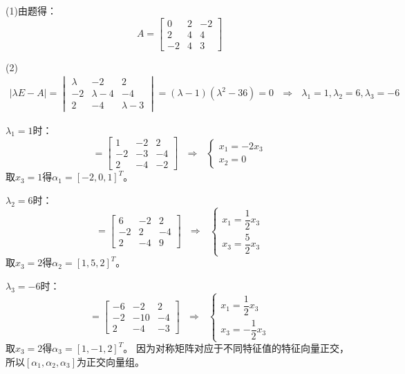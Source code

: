 \documentclass{article}
\begin{document}
\begin{jie}
(1)由题得：
\begin{equation*}
  A=\begin{bmatrix}
      0 & 2 & -2 \\
      2& 4 & 4\\
      -2 & 4 & 3
    \end{bmatrix}
\end{equation*}

(2)
\begin{align*}
|\lambda E-A|=
\begin{vmatrix}
  \lambda & -2 & 2 \\
      -2& \lambda-4 & -4\\
      2 & -4 & \lambda-3
\end{vmatrix}=(\lambda-1)(\lambda^2-36)=0~~~\Rightarrow~~~\lambda_1=1,\lambda_2=6,\lambda_3=-6
\end{align*}

$\lambda_1=1$时：
\begin{equation*}
[\lambda E-A]=
\begin{bmatrix}
 1 & -2 & 2 \\
      -2& -3 & -4\\
      2 & -4 & -2
\end{bmatrix}~~~\Rightarrow~~~
\begin{cases}
 x_1=-2x_3\\
 x_2=0
\end{cases}
\end{equation*}
取$x_3=1$得$\alpha_1=[-2,0,1]^T$。

$\lambda_2=6$时：
\begin{equation*}
[\lambda E-A]=
\begin{bmatrix}
 6 & -2 & 2 \\
      -2& 2 & -4\\
      2 & -4 & 9
\end{bmatrix}~~~\Rightarrow~~~
\begin{cases}
 x_1=\dfrac{1}{2}x_3\\[2mm]
 x_3=\dfrac{5}{2}x_3
\end{cases}
\end{equation*}
取$x_3=2$得$\alpha_2=[1,5,2]^T$。

$\lambda_3=-6$时：
\begin{equation*}
[\lambda E-A]=
\begin{bmatrix}
 -6 & -2 & 2 \\
      -2&-10 & -4\\
      2 & -4 &-3
\end{bmatrix}~~~\Rightarrow~~~
\begin{cases}
 x_1=\dfrac{1}{2}x_3\\[2mm]
 x_3=-\dfrac{1}{2}x_3
\end{cases}
\end{equation*}
取$x_3=2$得$\alpha_3=[1,-1,2]^T$。
因为对称矩阵对应于不同特征值的特征向量正交，所以$[\alpha_1,\alpha_2,\alpha_3]$为正交向量组。


\end{jie}
\end{document}
